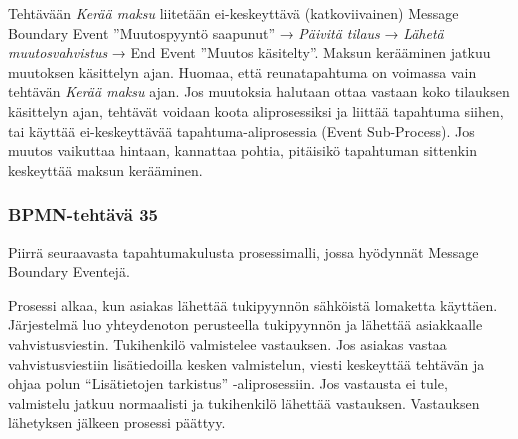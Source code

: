 \documentclass[
  finnish,
  letterpaper,
  DIV=11,
  numbers=noendperiod,
  oneside]{scrreprt}
\begin{document}
\begin{tcolorbox}[enhanced jigsaw, arc=.35mm, bottomrule=.15mm, bottomtitle=1mm, breakable, colback=white, colbacktitle=quarto-callout-tip-color!10!white, colframe=quarto-callout-tip-color-frame, coltitle=black, left=2mm, leftrule=.75mm, opacityback=0, opacitybacktitle=0.6, rightrule=.15mm, title=\textcolor{quarto-callout-tip-color}{\faLightbulb}\hspace{0.5em}{Malliratkaisu}, titlerule=0mm, toprule=.15mm, toptitle=1mm]

Tehtävään \emph{Kerää maksu} liitetään ei-keskeyttävä (katkoviivainen)
Message Boundary Event ''Muutospyyntö saapunut'' → \emph{Päivitä tilaus}
→ \emph{Lähetä muutosvahvistus} → End Event ''Muutos käsitelty''. Maksun
kerääminen jatkuu muutoksen käsittelyn ajan. Huomaa, että reunatapahtuma
on voimassa vain tehtävän \emph{Kerää maksu} ajan. Jos muutoksia
halutaan ottaa vastaan koko tilauksen käsittelyn ajan, tehtävät voidaan
koota aliprosessiksi ja liittää tapahtuma siihen, tai käyttää
ei-keskeyttävää tapahtuma-aliprosessia (Event Sub-Process). Jos muutos
vaikuttaa hintaan, kannattaa pohtia, pitäisikö tapahtuman sittenkin
keskeyttää maksun kerääminen.

\end{tcolorbox}

\subsubsection{BPMN-tehtävä 35}\label{bpmn-tehtuxe4vuxe4-35}

Piirrä seuraavasta tapahtumakulusta prosessimalli, jossa hyödynnät
Message Boundary Eventejä.

Prosessi alkaa, kun asiakas lähettää tukipyynnön sähköistä lomaketta
käyttäen. Järjestelmä luo yhteydenoton perusteella tukipyynnön ja
lähettää asiakkaalle vahvistusviestin. Tukihenkilö valmistelee
vastauksen. Jos asiakas vastaa vahvistusviestiin lisätiedoilla kesken
valmistelun, viesti keskeyttää tehtävän ja ohjaa polun ``Lisätietojen
tarkistus'' -aliprosessiin. Jos vastausta ei tule, valmistelu jatkuu
normaalisti ja tukihenkilö lähettää vastauksen. Vastauksen lähetyksen
jälkeen prosessi päättyy.
\end{document}
